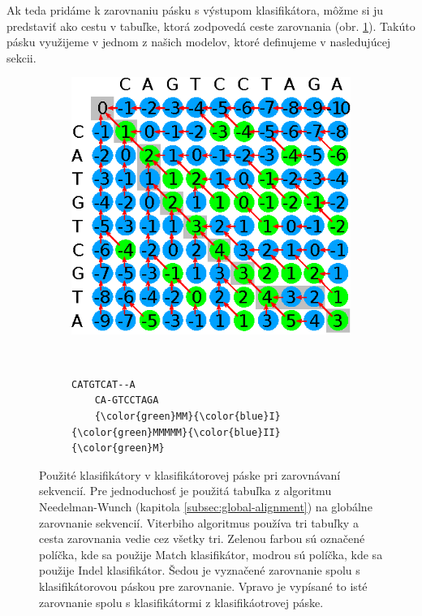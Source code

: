 Ak teda pridáme k zarovnaniu pásku s výstupom klasifikátora, môžme si ju predstaviť ako cestu v tabuľke, ktorá zodpovedá ceste zarovnania
(obr. \ref{fig:clf-tape}). Takúto pásku využijeme v jednom z našich modelov, ktoré definujeme v nasledujúcej sekcii.
\begin{figure}[htp]
    \centering
    \begin{subfigure}[m]{0.5\textwidth}
    \centering
    \includegraphics[width=\textwidth]{images/clf_tape}
    \end{subfigure}
    ~
    \begin{subfigure}[m]{0.3\textwidth}
    \centering
    \begin{BVerbatim}[commandchars=\\\{\}]
    CATGTCAT--A
    CA-GTCCTAGA
    {\color{green}MM}{\color{blue}I}{\color{green}MMMMM}{\color{blue}II}{\color{green}M}
    \end{BVerbatim}
    \end{subfigure}
    \caption[Použité klasifikátory v klasifikátorovej páske]{Použité klasifikátory v klasifikátorovej páske pri zarovnávaní sekvencií. Pre jednoduchosť je použitá tabuľka z algoritmu Needelman-Wunch (kapitola \ref{subsec:global-alignment}) na globálne zarovnanie sekvencií. Viterbiho algoritmus používa tri tabuľky a cesta zarovnania vedie cez všetky tri. Zelenou farbou sú označené políčka, kde sa použije Match klasifikátor, modrou sú políčka, kde sa použije Indel klasifikátor. Šedou je vyznačené zarovnanie spolu s klasifikátorovou páskou pre zarovnanie. Vpravo je vypísané to isté zarovnanie spolu s klasifikátormi z klasifikáotrovej páske.}
    \label{fig:clf-tape}
\end{figure}


